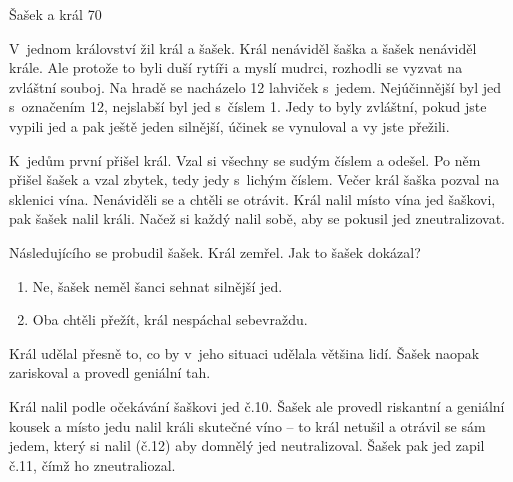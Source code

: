 Šašek a král
70 %

V~jednom království žil král a šašek. Král nenáviděl šaška a šašek nenáviděl krále. Ale protože to byli duší rytíři a myslí mudrci, rozhodli se vyzvat na zvláštní souboj. Na hradě se nacházelo 12 lahviček s~jedem. Nejúčinnější byl jed s~označením 12, nejslabší byl jed s~číslem 1. Jedy to byly zvláštní, pokud jste vypili jed a pak ještě jeden silnější, účinek se vynuloval a vy jste přežili.

K~jedům první přišel král. Vzal si všechny se sudým číslem a odešel. Po něm přišel šašek a vzal zbytek, tedy jedy s~lichým číslem. Večer král šaška pozval na sklenici vína. Nenáviděli se a chtěli se otrávit. Král nalil místo vína jed šaškovi, pak šašek nalil králi. Načež si každý nalil sobě, aby se pokusil jed zneutralizovat.

Následujícího se probudil šašek. Král zemřel. Jak to šašek dokázal?


\begin{enumerate}
\item Ne, šašek neměl šanci sehnat silnější jed.
\item Oba chtěli přežít, král nespáchal sebevraždu.
\end{enumerate}

Král udělal přesně to, co by v~jeho situaci udělala většina lidí. Šašek naopak zariskoval a provedl geniální tah.

Král nalil podle očekávání šaškovi jed č.10. Šašek ale provedl riskantní a geniální kousek a místo jedu nalil králi skutečné víno – to král netušil a otrávil se sám jedem, který si nalil (č.12) aby domnělý jed neutralizoval. Šašek pak jed zapil č.11, čímž ho zneutraliozal.
